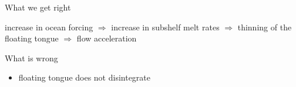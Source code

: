 \documentclass[hide notes,intlimits]{beamer}
\begin{document}
  {
}

\begin{frame}
\end{frame}

  {
}

\begin{frame}[plain]
  \begin{figure}
\end{figure}
\end{frame}

\begin{frame}{}
  \begin{block}{What we get right}
  \begin{centering}
    increase in ocean forcing \alert{$\Rightarrow$} increase in subshelf melt rates \alert{$\Rightarrow$} thinning of the floating tongue \alert{$\Rightarrow$} flow acceleration
  \end{centering}
  \end{block}
  \begin{block}{What is wrong}
    \begin{itemize}
      \item floating tongue does not disintegrate
    \end{itemize}
  \end{block}
\end{frame}
\end{document}
